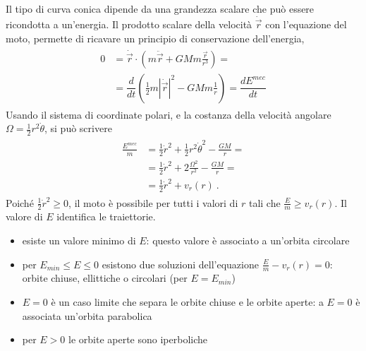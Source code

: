\documentclass[letterpaper,10pt,italian]{jupyterBook}
\begin{document}
\sphinxAtStartPar
Il tipo di curva conica dipende da una grandezza scalare che può essere ricondotta a un’energia. Il prodotto scalare della velocità \(\dot{\vec{r}}\) con l’equazione del moto, permette di ricavare un principio di conservazione dell’energia,
\begin{equation*}
\begin{split}\begin{aligned}
  0 & = \dot{\vec{r}} \cdot \left( m \ddot{\vec{r}} + G M m \frac{\vec{r}}{r^3} \right) = \\
    & = \dfrac{d}{dt} \left( \frac{1}{2} m \left|\dot{\vec{r}}\right|^2 - G M m \frac{1}{r}\right) = \dfrac{d E^{mec}}{dt}
\end{aligned}\end{split}
\end{equation*}
\sphinxAtStartPar
Usando il sistema di coordinate polari, e la costanza della velocità angolare \(\Omega = \frac{1}{2}{r^2}{\dot{\theta}}\), si può scrivere
\begin{equation*}
\begin{split}\begin{aligned}
  \frac{E^{mec}}{m} & = \frac{1}{2} \dot{r}^2 + \frac{1}{2} r^2 \dot{\theta}^2 - \frac{G M}{r} = \\
                    & = \frac{1}{2} \dot{r}^2 + 2 \frac{\Omega^2}{r^2} - \frac{G M}{r} = \\
                    & = \frac{1}{2} \dot{r}^2 + v_r(r) \ .
\end{aligned}\end{split}
\end{equation*}
\sphinxAtStartPar
Poiché \(\frac{1}{2}\dot{r}^2 \ge 0\), il moto è possibile per tutti i valori di \(r\) tali che \(\frac{E}{m} \ge v_r(r)\). Il valore di \(E\) identifica le traiettorie.  
\begin{itemize}
\item {} 
\sphinxAtStartPar
esiste un valore minimo di \(E\): questo valore è associato a un’orbita circolare

\item {} 
\sphinxAtStartPar
per \(E_{min} \le E \le 0\) esistono due soluzioni dell’equazione \(\frac{E}{m} - v_r(r) = 0\): orbite chiuse, ellittiche o circolari (per \(E = E_{min}\))

\item {} 
\sphinxAtStartPar
\(E = 0\) è un caso limite che separa le orbite chiuse e le orbite aperte: a \(E = 0\) è associata un’orbita parabolica

\item {} 
\sphinxAtStartPar
per \(E > 0\) le orbite aperte sono iperboliche

\end{itemize}
\end{document}
